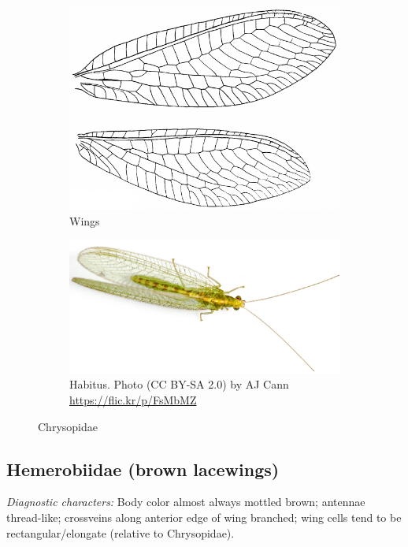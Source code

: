 \documentclass[letterpaper, 11pt]{article}
\begin{document}
\begin{figure}[ht!]
    \centering
    \begin{subfigure}[ht!]{0.38\textwidth}
        \includegraphics[width=\textwidth]{figures/ChrysopidWing}
        \caption{Wings \citep[][Fig. 186]{comstock1918wings}}
        \label{fig:chrysopid1}
    \end{subfigure}
    \qquad
    \begin{subfigure}[ht!]{0.5\textwidth}
        \includegraphics[width=\textwidth]{figures/ChrysopidHabitus}
        \caption{Habitus. Photo (CC BY-SA 2.0) by AJ Cann \url{https://flic.kr/p/FsMbMZ}}
        \label{fig:chrysopid2}
    \end{subfigure}
    \caption{Chrysopidae}\label{fig:chrysopids}
\end{figure}

\subsection{Hemerobiidae (brown lacewings)}
\noindent{}\textit{Diagnostic characters:} Body color almost always mottled brown; antennae thread-like; crossveins along anterior edge of wing branched; wing cells tend to be rectangular/elongate (relative to Chrysopidae).\\
\end{document}
